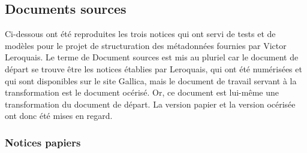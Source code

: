 \documentclass[a4paper,12pt,twoside]{book}
\begin{document}
	\subsection{\label{doc_sources}Documents sources}
	
	Ci-dessous ont été reproduites les trois notices qui ont servi de tests et de modèles pour le projet de structuration des métadonnées fournies par Victor Leroquais. Le terme de \og Document sources\fg{} est mis au pluriel car le document de départ se trouve être les notices établies par Leroquais, qui ont été numérisées et qui sont disponibles sur le site Gallica, mais le document de travail servant à la transformation est le document océrisé. Or, ce document est lui-même une transformation du document de départ. La version papier et la version océrisée ont donc été mises en regard.
	
	\subsubsection{\label{notices_papiers}Notices papiers}
	
	
\end{document}
